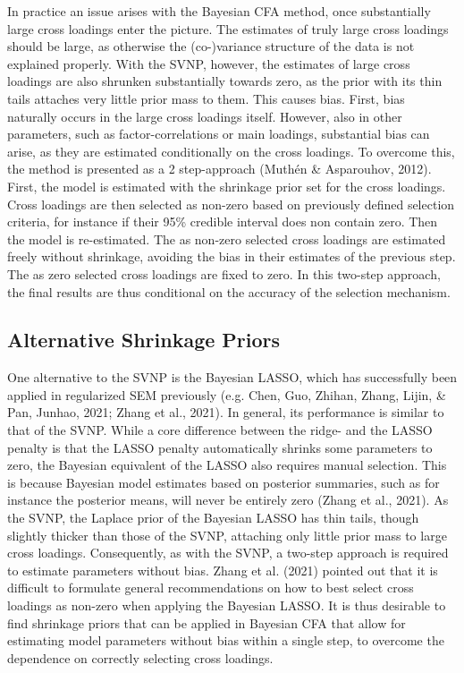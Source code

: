 \documentclass[
  man, donotrepeattitle,floatsintext]{apa6}
\begin{document}
In practice an issue arises with the Bayesian CFA method, once
substantially large cross loadings enter the picture. The estimates of
truly large cross loadings should be large, as otherwise the
(co-)variance structure of the data is not explained properly. With the
SVNP, however, the estimates of large cross loadings are also shrunken
substantially towards zero, as the prior with its thin tails attaches
very little prior mass to them. This causes bias. First, bias naturally
occurs in the large cross loadings itself. However, also in other
parameters, such as factor-correlations or main loadings, substantial
bias can arise, as they are estimated conditionally on the cross
loadings. To overcome this, the method is presented as a 2 step-approach
(Muthén \& Asparouhov, 2012). First, the model is estimated with the
shrinkage prior set for the cross loadings. Cross loadings are then
selected as non-zero based on previously defined selection criteria, for
instance if their 95\% credible interval does non contain zero. Then the
model is re-estimated. The as non-zero selected cross loadings are
estimated freely without shrinkage, avoiding the bias in their estimates
of the previous step. The as zero selected cross loadings are fixed to
zero. In this two-step approach, the final results are thus conditional
on the accuracy of the selection mechanism.

\hypertarget{alternative-shrinkage-priors}{%
\subsection{Alternative Shrinkage Priors}\label{alternative-shrinkage-priors}}

One alternative to the SVNP is the Bayesian LASSO, which has
successfully been applied in regularized SEM previously (e.g. Chen, Guo, Zhihan, Zhang, Lijin, \& Pan, Junhao, 2021; Zhang et al., 2021). In general, its
performance is similar to that of the SVNP. While a core difference
between the ridge- and the LASSO penalty is that the LASSO penalty
automatically shrinks some parameters to zero, the Bayesian equivalent
of the LASSO also requires manual selection. This is because Bayesian
model estimates based on posterior summaries, such as for instance the
posterior means, will never be entirely zero (Zhang et al., 2021). As
the SVNP, the Laplace prior of the Bayesian LASSO has thin tails, though
slightly thicker than those of the SVNP, attaching only little prior
mass to large cross loadings. Consequently, as with the SVNP, a two-step
approach is required to estimate parameters without bias.
Zhang et al. (2021) pointed out that it is difficult to formulate
general recommendations on how to best select cross loadings as non-zero
when applying the Bayesian LASSO. It is thus desirable to find shrinkage
priors that can be applied in Bayesian CFA that allow for estimating
model parameters without bias within a single step, to overcome the
dependence on correctly selecting cross loadings.
\end{document}
